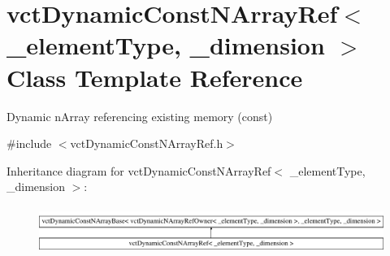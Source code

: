 \hypertarget{classvct_dynamic_const_n_array_ref}{\section{vct\-Dynamic\-Const\-N\-Array\-Ref$<$ \-\_\-element\-Type, \-\_\-dimension $>$ Class Template Reference}
\label{classvct_dynamic_const_n_array_ref}
}


Dynamic n\-Array referencing existing memory (const)  




{\ttfamily \#include $<$vct\-Dynamic\-Const\-N\-Array\-Ref.\-h$>$}

Inheritance diagram for vct\-Dynamic\-Const\-N\-Array\-Ref$<$ \-\_\-element\-Type, \-\_\-dimension $>$\-:\begin{figure}[H]
\begin{center}
\leavevmode
\includegraphics[height=1.577465cm]{db/d5c/classvct_dynamic_const_n_array_ref}
\end{center}
\end{figure}
